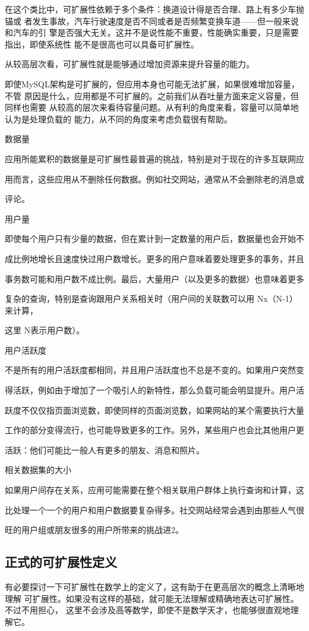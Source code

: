 在这个类比中，可扩展性依赖于多个条件：换道设计得是否合理、路上有多少车抛锚或
者发生事故，汽车行驶速度是否不同或者是否频繁变换车道——但一般来说和汽车的引
擎是否强大无关。这并不是说性能不重要，性能确实重要，只是需要指出，即使系统性
能不是很高也可以具备可扩展性。

从较高层次看，可扩展性就是能够通过增加资源来提升容量的能力。

即使MySQL架构是可扩展的，但应用本身也可能无法扩展，如果很难增加容量，不管
原因是什么，应用都是不可扩展的。之前我们从吞吐量方面来定义容量，但同样也需要
从较高的层次来看待容量问题。从有利的角度来看，容量可以简单地认为是处理负载的
能力，从不同的角度来考虑负载很有帮助。

数据量

应用所能累积的数据量是可扩展性最普遍的挑战，特别是对于现在的许多互联网应

用而言，这些应用从不删除任何数据。例如社交网站，通常从不会删除老的消息或

评论。

用户量

即使每个用户只有少量的数据，但在累计到一定数量的用户后，数据量也会开始不

成比例地增长且速度快过用户数增长。更多的用户意味着要处理更多的事务，并且

事务数可能和用户数不成比例。最后，大量用户（以及更多的数据）也意味着更多

复杂的查询，特别是查询跟用户关系相关时（用户间的关联数可以用 Nx（N-1）来计算，

这里 N表示用户数）。

用户活跃度

不是所有的用户活跃度都相同，并且用户活跃度也不总是不变的。如果用户突然变

得活跃，例如由于增加了一个吸引人的新特性，那么负载可能会明显提升。用户活

跃度不仅仅指页面浏览数，即使同样的页面浏览数，如果网站的某个需要执行大量

工作的部分变得流行，也可能导致更多的工作。另外，某些用户也会比其他用户更

活跃：他们可能比一般人有更多的朋友、消息和照片。

相关数据集的大小

如果用户间存在关系，应用可能需要在整个相关联用户群体上执行查询和计算，这

比处理一个一个的用户和用户数据要复杂得多。社交网站经常会遇到由那些人气很

旺的用户组或朋友很多的用户所带来的挑战进2。

\subsection{正式的可扩展性定义}
有必要探讨一下可扩展性在数学上的定义了，这有助于在更高层次的概念上清晰地理解
可扩展性。如果没有这样的基础，就可能无法理解或精确地表达可扩展性。不过不用担心，
这里不会涉及高等数学，即使不是数学天才，也能够很直观地理解它。


